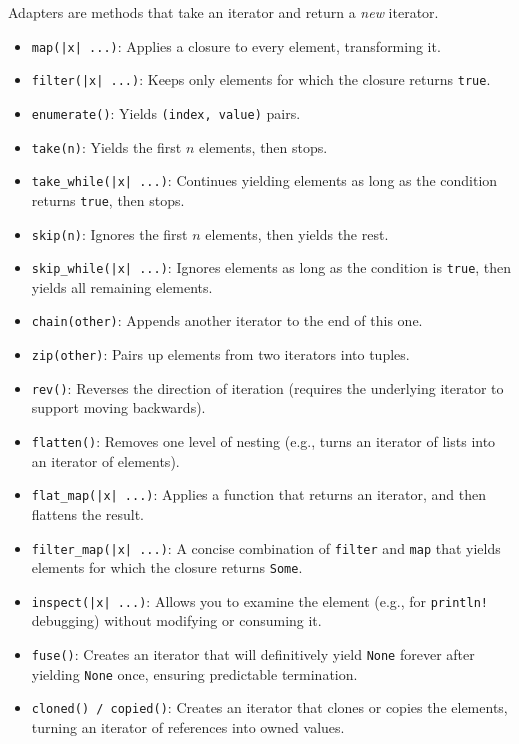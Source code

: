 Adapters are methods that take an iterator and return a \textit{new} iterator.
\begin{itemize}
    \item \texttt{map(|x| ...)}: Applies a closure to every element, transforming it.
    \item \texttt{filter(|x| ...)}: Keeps only elements for which the closure returns \texttt{true}.
    \item \texttt{enumerate()}: Yields \texttt{(index, value)} pairs.
    \item \texttt{take(n)}: Yields the first $n$ elements, then stops.
    \item \texttt{take\_while(|x| ...)}: Continues yielding elements as long as the condition returns \texttt{true}, then stops.
    \item \texttt{skip(n)}: Ignores the first $n$ elements, then yields the rest.
    \item \texttt{skip\_while(|x| ...)}: Ignores elements as long as the condition is \texttt{true}, then yields all remaining elements.
    \item \texttt{chain(other)}: Appends another iterator to the end of this one.
    \item \texttt{zip(other)}: Pairs up elements from two iterators into tuples.
    \item \texttt{rev()}: Reverses the direction of iteration (requires the underlying iterator to support moving backwards).
    \item \texttt{flatten()}: Removes one level of nesting (e.g., turns an iterator of lists into an iterator of elements).
    \item \texttt{flat\_map(|x| ...)}: Applies a function that returns an iterator, and then flattens the result.
    \item \texttt{filter\_map(|x| ...)}: A concise combination of \texttt{filter} and \texttt{map} that yields elements for which the closure returns \texttt{Some}.
    \item \texttt{inspect(|x| ...)}: Allows you to examine the element (e.g., for \texttt{println!} debugging) without modifying or consuming it.
    \item \texttt{fuse()}: Creates an iterator that will definitively yield \texttt{None} forever after yielding \texttt{None} once, ensuring predictable termination.
    \item \texttt{cloned() / copied()}: Creates an iterator that clones or copies the elements, turning an iterator of references into owned values.
\end{itemize}

